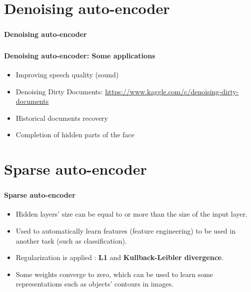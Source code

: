 \documentclass[xcolor=table]{beamer}
\begin{document}
\section{Denoising auto-encoder}

\begin{frame}
\frametitle{\inserttitle}
\framesubtitle{Denoising auto-encoder}


\end{frame}

\begin{frame}
\frametitle{\inserttitle}
\framesubtitle{Denoising auto-encoder: Some applications}

\begin{itemize}
	\item Improving speech quality (sound) \cite{2013-lu}
	\item Denoising Dirty Documents: \url{https://www.kaggle.com/c/denoising-dirty-documents}
	\item Historical documents recovery \cite{2019-neji}
	\item Completion of hidden parts of the face \cite{2017-li-al}
\end{itemize}

\end{frame}

\section{Sparse auto-encoder}

\begin{frame}
\frametitle{\inserttitle}
\framesubtitle{Sparse auto-encoder}

\begin{itemize}
	\item Hidden layers' size can be equal to or more than the size of the input layer.
	\item Used to automatically learn features (feature engineering) to be used in another task (such as classification).
	\item Regularization is applied : \textbf{L1} and \textbf{Kullback-Leibler divergence}.
	\item Some weights converge to zero, which can be used to learn some representations such as objects' contours in images.
\end{itemize}

\end{frame}
\end{document}
